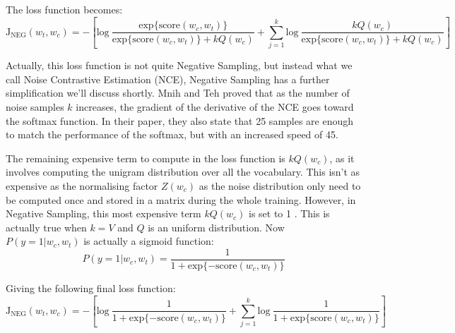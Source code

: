 The loss function becomes:
\begin{equation}
    \text{J}_{\text{NEG}}(w_t, w_c)  = -\left[\text{log}~\frac{\text{exp}\{\text{score}(w_c, w_t)\}}{\text{exp}\{\text{score}(w_c, w_t)\} + kQ(w_c)} + \sum_{j=1}^k\text{log}~\frac{kQ(w_c)}{\text{exp}\{\text{score}(w_c, w_t)\} + kQ(w_c)}\right]
\end{equation}

Actually, this loss function is not quite Negative Sampling, but instead what we call Noise Contrastive Estimation (NCE), Negative Sampling has a further simplification we'll discuss shortly. Mnih and Teh \cite{nce} proved that as the number of noise samples $k$ increases, the gradient of the derivative of the NCE goes toward the softmax function. In their paper, they also state that 25 samples are enough to match the performance of the softmax, but with an increased speed of 45.

The remaining expensive term to compute in the loss function is $kQ(w_c)$, as it involves computing the unigram distribution over all the vocabulary. This isn't as expensive as the normalising factor $Z(w_c)$ as the noise distribution only need to be computed once and stored in a matrix during the whole training. However, in Negative Sampling, this most expensive term $kQ(w_c)$ is set to 1 \cite{word2vec2}. This is actually true when $k=V$ and $Q$ is an uniform distribution.	 Now $P(y=1| w_c, w_t)$ is actually a sigmoid function:
\begin{equation}
    P(y=1| w_c, w_t) = \frac{1}{1 + \text{exp}\{-\text{score}(w_c, w_t)\}}
\end{equation}

Giving the following final loss function:
\begin{equation}
    \text{J}_{\text{NEG}}(w_t, w_c)  = -\left[\text{log}~\frac{1}{1 + \text{exp}\{-\text{score}(w_c, w_t)\}} + \sum_{j=1}^k\text{log}~\frac{1}{1 + \text{exp}\{\text{score}(w_c, w_t)\}}\right]
\end{equation}

